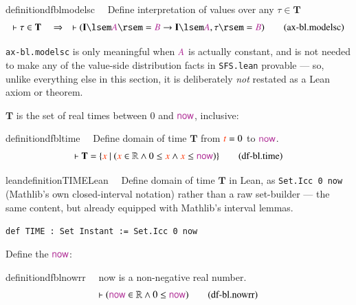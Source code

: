 \begin{restatable}{definition}{dfblmodelsc}~~ Define interpretation of values over
any $\tau \in \mathbf{T}$
\begin{align}
\vdash \tau \in \mathbf{T}\quad\Rightarrow\quad \vdash ( \mathbf{I} \lsem
    \mc{A} \rsem = \mc{B} \rightarrow \mathbf{I} \lsem \mc{A} , \tau \rsem =
    \mc{B} )\label{eq:df-bl.modelsc}\tag{ax-bl.modelsc}
\end{align}
\end{restatable}

\pn \texttt{ax-bl.modelsc} is only meaningful when $\mc{A}$ is actually constant, and is not needed to make
any of the value-side distribution facts in \texttt{SFS.lean} provable --- so, unlike everything else in this
section, it is deliberately \emph{not} restated as a Lean axiom or theorem.


\pn $\mathbf{T}$ is the set of real times between 0 and $\mathsf{\mc{now}}$, inclusive:

\begin{restatable}{definition}{dfbltime}~~ Define domain of time $\mathbf{T}$
from $\msc{t} = 0$ to $\mathsf{\mc{now}}$.
\begin{align}
\vdash \mathbf{T} = \{ \msc{x}~\vert~( \msc{x} \in \mathbb{R} \wedge 0 \le \msc{x}
    \wedge \msc{x} \le \mathsf{\mc{now}} )
    \}\label{eq:df-bl.time}\tag{df-bl.time}
\end{align}
\end{restatable}

\begin{restatable}{leandefinition}{TIMELean}~~ Define domain of time $\mathbf{T}$ in Lean, as
\texttt{Set.Icc 0 now} (Mathlib's own closed-interval notation) rather than a raw set-builder --- the same
content, but already equipped with Mathlib's interval lemmas.

\texttt{\textcolor{leancolor}{def} \textcolor{leanyellow}{TIME} : Set Instant := Set.Icc 0 now}
\label{TIME}
\end{restatable}

\pn Define the  $\mathsf{\mc{now}}$:

\begin{restatable}{definition}{dfblnowrr}~~ now is a non-negative real number.
\begin{align}
\vdash ( \mathsf{\mc{now}} \in \mathbb{R} \wedge 0 \le \mathsf{\mc{now}}
    )\label{eq:df-bl.nowrr}\tag{df-bl.nowrr}
\end{align}
\end{restatable}

